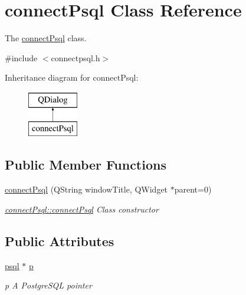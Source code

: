 \hypertarget{classconnect_psql}{}\section{connect\+Psql Class Reference}
\label{classconnect_psql}


The \hyperlink{classconnect_psql}{connect\+Psql} class.  




{\ttfamily \#include $<$connectpsql.\+h$>$}

Inheritance diagram for connect\+Psql\+:\begin{figure}[H]
\begin{center}
\leavevmode
\includegraphics[height=2.000000cm]{classconnect_psql}
\end{center}
\end{figure}
\subsection*{Public Member Functions}
\begin{DoxyCompactItemize}
\item 
\hyperlink{classconnect_psql_aee2b55cd64f5b2fac084eda4e6db0075}{connect\+Psql} (Q\+String window\+Title, Q\+Widget $\ast$parent=0)
\begin{DoxyCompactList}\small\item\em \hyperlink{classconnect_psql_aee2b55cd64f5b2fac084eda4e6db0075}{connect\+Psql\+::connect\+Psql} Class constructor \end{DoxyCompactList}\end{DoxyCompactItemize}
\subsection*{Public Attributes}
\begin{DoxyCompactItemize}
\item 
\mbox{\label{classconnect_psql_a5855dbe20b8e699563c0958462236bf2}} 
\hyperlink{classpsql}{psql} $\ast$ \hyperlink{classconnect_psql_a5855dbe20b8e699563c0958462236bf2}{p}
\begin{DoxyCompactList}\small\item\em p A Postgre\+S\+QL pointer \end{DoxyCompactList}\end{DoxyCompactItemize}


